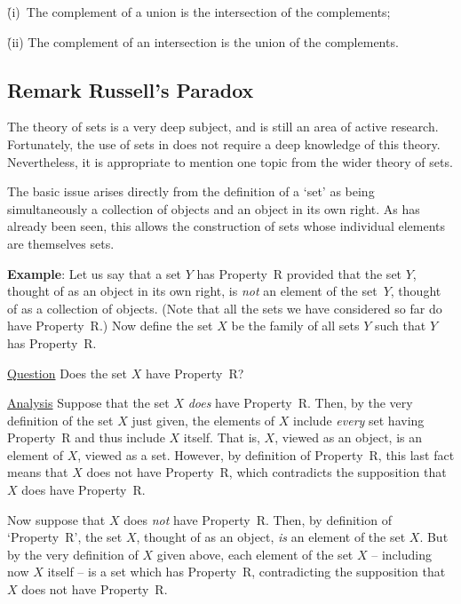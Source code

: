 {        \h (i)\, The complement of a union is the intersection of the complements;

       \h (ii) The complement of an intersection is the union of the complements.


\VV

\V

        \subsection{\small{\bf Remark} Russell's Paradox}

        The theory of sets is a very deep subject, and is still an area of active research.
    Fortunately, the use of sets in {\TheseNotes} does not require a deep knowledge of this theory.
    Nevertheless, it is appropriate to mention one topic from the wider theory of sets.

        The basic issue arises directly from the definition of a `set' as being simultaneously a collection of objects and an object in its own right.
    As has already been seen, this allows the construction of sets whose individual elements are themselves sets.

\V

        {\bf Example}: Let us say that a set $Y$ has Property~R provided that the set $Y$,
    thought of as an object in its own right, is {\em not} an element of the set~$Y$, thought of as a collection of objects.
    (Note that all the sets we have considered so far do have Property~R.)
    Now define the set $X$ be the family of all sets $Y$ such that $Y$ has Property~R.

        \underline{Question} Does the set $X$ have Property~R?

        \underline{Analysis} Suppose that the set $X$ {\em does} have Property~R.
    Then, by the very definition of the set $X$ just given, the elements of $X$ include {\em every} set having Property~R and thus include $X$ itself.
    That is, $X$, viewed as an object, is an element of $X$, viewed as a set.
    However, by definition of Property~R, this last fact means that $X$ does not have Property~R, which contradicts the supposition that $X$ does have Property~R.

        Now suppose that $X$ does {\em not} have Property~R. Then, by definition of `Property~R',
    the set $X$, thought of as an object, {\em is} an element of the set $X$.
    But by the very definition of $X$ given above, each element of the set $X$ -- including now $X$ itself --
    is a set which has Property~R, contradicting the supposition that $X$ does not have Property~R.

}
